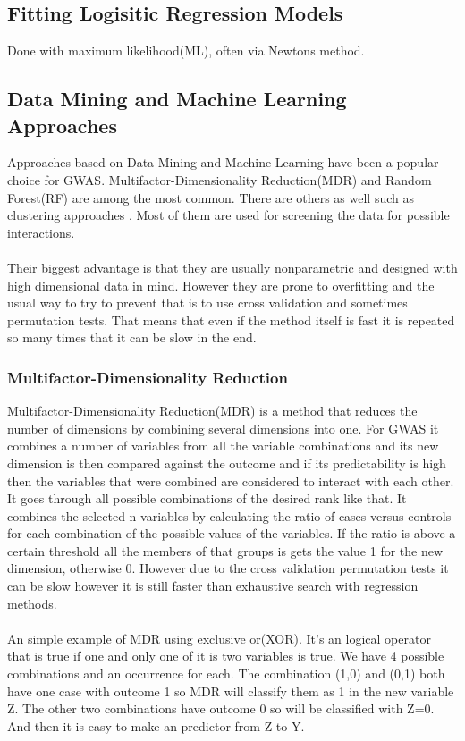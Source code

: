 \documentclass[10pt,a4paper]{article}
\begin{document}
\subsection{Fitting Logisitic Regression Models}
Done with maximum likelihood(ML), often via Newtons method.

\subsection{Data Mining and Machine Learning Approaches}
\label{data_machine_learning}
Approaches based on Data Mining and Machine Learning have been a popular choice for GWAS. Multifactor-Dimensionality Reduction(MDR)\cite{mdr_2001} and Random Forest(RF)\cite{random_forest} are among the most common\cite{gene_enviroment_2013,cordell_detect_review}. There are others as well such as clustering approaches \cite{fast_high_order_cluster}. Most of them are used for screening the data for possible interactions\cite{gene_enviroment_2013,cordell_detect_review}.\\
\\
Their biggest advantage is that they are usually nonparametric and designed with high dimensional data in mind. However they are prone to overfitting and the usual way to try to prevent that is to use cross validation and sometimes permutation tests. That means that even if the method itself is fast it is repeated so many times that it can be slow in the end.\cite{cordell_detect_review}

\subsubsection{Multifactor-Dimensionality Reduction}
Multifactor-Dimensionality Reduction(MDR) is a method that reduces the number of dimensions by combining several dimensions into one. For GWAS it combines a number of variables from all the variable combinations and its new dimension is then compared against the outcome and if its predictability is high then the variables that were combined are considered to interact with each other. It goes through all possible combinations of the desired rank like that. It combines the selected n variables by calculating the ratio of cases versus controls for each combination of the possible values of the variables. If the ratio is above a certain threshold all the members of that groups is gets the value 1 for the new dimension, otherwise 0. However due to the cross validation permutation tests it can be slow however it is still faster than exhaustive search with regression methods.\cite{cordell_detect_review,mdr_2001}\\
\\
An simple example of MDR using exclusive or(XOR). It's an logical operator that is true if one and only one of it is two variables is true. We have 4 possible combinations and an occurrence for each. The combination (1,0) and (0,1) both have one case with outcome 1 so MDR will classify them as 1 in the new variable Z. The other two combinations have outcome 0 so will be classified with Z=0. And then it is easy to make an predictor from Z to Y.
\end{document}
